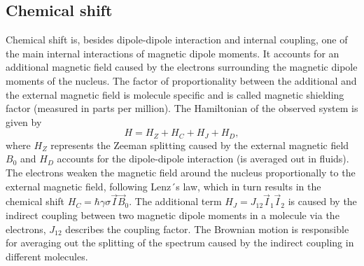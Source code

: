 \subsection{Chemical shift}
Chemical shift is, besides dipole-dipole interaction and internal coupling, one of the main internal interactions of magnetic dipole moments. It accounts for an additional magnetic field caused by the electrons surrounding the magnetic dipole moments of the nucleus. The factor of proportionality between the additional and the external magnetic field is molecule specific and is called magnetic shielding factor (measured in parts per million). The Hamiltonian of the observed system is given by 
\begin{equation}
	H = H_Z + H_C + H_J + H_D\mathrm{,}
	\label{eq:3}
\end{equation}  
where $H_Z$ represents the Zeeman splitting caused by the external magnetic field $B_0$ and $H_D$ accounts for the dipole-dipole interaction (is averaged out in fluids). The electrons weaken the magnetic field around the nucleus proportionally to the external magnetic field, following Lenz´s law, which in turn results in the chemical shift $H_C = \hbar \gamma \sigma \vec{I}\vec{B}_0$. The additional term $H_J = J_{12} \vec{I}_1 \vec{I}_2$ is caused by the indirect coupling between two magnetic dipole moments in a molecule via the electrons, $J_{12} $ describes the coupling factor.
The Brownian motion is responsible for averaging out the splitting of the spectrum caused by the indirect coupling in different molecules.\cite{Hornak} \cite{IndirectCoupling}

